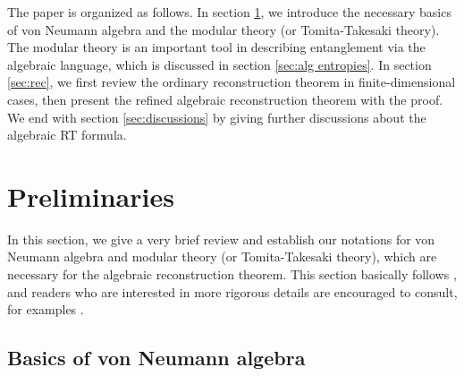 \documentclass[a4paper,11pt]{article}
\newtheorem{defn}[thm]{Definition}
\newcommand{\ket}[1]{| #1 \rangle } %
\newcommand{\braket}[2]{\langle  #1 \vphantom{#2} | #2 \vphantom{#1} \rangle } %
\renewcommand{\=}[1]{\stackrel{#1}{=}} %
\def\H{\mathcal{H}}
\begin{document}
The paper is organized as follows. In section \ref{sec:pre}, we introduce the necessary basics of von Neumann algebra and the modular theory (or Tomita-Takesaki theory). The modular theory is an important tool in describing entanglement via the algebraic language, which is discussed in section \ref{sec:alg entropies}. In section \ref{sec:rec}, we first review the ordinary reconstruction theorem in finite-dimensional cases, then present the refined algebraic reconstruction theorem with the proof. We end with section \ref{sec:discussions} by giving further discussions about the algebraic RT formula. 



\section{Preliminaries}\label{sec:pre}

In this section, we give a very brief review and establish our notations for von Neumann algebra and modular theory (or Tomita-Takesaki theory), which are necessary for the algebraic reconstruction theorem. This section basically follows \cite{Witten:2018zxz,Kang:2018xqy,Kang:2019dfi}, and readers who are interested in more rigorous details are encouraged to consult, for examples \cite{Vaughan2009,Sorce:2023fdx,reed1972methods,takesaki2006tomita}.

\subsection{Basics of von Neumann algebra}\label{subsec:vN alg}


\end{document}
